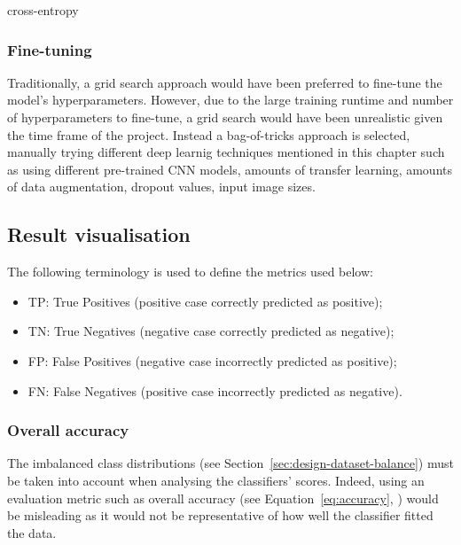 cross-entropy

\subsubsection{Fine-tuning}

Traditionally, a grid search approach would have been preferred to fine-tune the model's hyperparameters. However, due to the large training runtime and number of hyperparameters to fine-tune, a grid search would have been unrealistic given the time frame of the project. Instead a bag-of-tricks approach is selected, manually trying different deep learnig techniques mentioned in this chapter such as using different pre-trained CNN models, amounts of transfer learning, amounts of data augmentation, dropout values, input image sizes.


\subsection{Result visualisation}
\label{sec:design-results-visualisation}

The following terminology is used to define the metrics used below:
\begin{itemize}
    \item TP: True Positives (positive case correctly predicted as positive);
    \item TN: True Negatives (negative case correctly predicted as negative);
    \item FP: False Positives (negative case incorrectly predicted as positive);
    \item FN: False Negatives (positive case incorrectly predicted as negative).
\end{itemize}

\subsubsection{Overall accuracy}

The imbalanced class distributions (see Section~\ref{sec:design-dataset-balance}) must be taken into account when analysing the classifiers' scores. Indeed, using an evaluation metric such as overall accuracy (see Equation~\ref{eq:accuracy}, \cite{Falconi2019}) would be misleading as it would not be representative of how well the classifier fitted the data.

